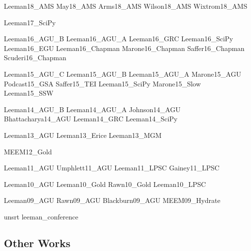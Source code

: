 \documentclass[letterpaper]{article}
\begin{document}
\begingroup
\renewcommand{\section}[2]{}

\nocite{conf}{Leeman18_AMS}
\nocite{conf}{May18_AMS}
\nocite{conf}{Arms18_AMS}
\nocite{conf}{Wilson18_AMS}
\nocite{conf}{Wixtrom18_AMS}

\nocite{conf}{Leeman17_SciPy}

\nocite{conf}{Leeman16_AGU_B}
\nocite{conf}{Leeman16_AGU_A}
\nocite{conf}{Leeman16_GRC}
\nocite{conf}{Leeman16_SciPy}
\nocite{conf}{Leeman16_EGU}
\nocite{conf}{Leeman16_Chapman}
\nocite{conf}{Marone16_Chapman}
\nocite{conf}{Saffer16_Chapman}
\nocite{conf}{Scuderi16_Chapman}

\nocite{conf}{Leeman15_AGU_C}
\nocite{conf}{Leeman15_AGU_B}
\nocite{conf}{Leeman15_AGU_A}
\nocite{conf}{Marone15_AGU}
\nocite{conf}{Podcast15_GSA}
\nocite{conf}{Saffer15_TEI}
\nocite{conf}{Leeman15_SciPy}
\nocite{conf}{Marone15_Slow}
\nocite{conf}{Leeman15_SSW}

\nocite{conf}{Leeman14_AGU_B}
\nocite{conf}{Leeman14_AGU_A}
\nocite{conf}{Johnson14_AGU}
\nocite{conf}{Bhattacharya14_AGU}
\nocite{conf}{Leeman14_GRC}
\nocite{conf}{Leeman14_SciPy}

\nocite{conf}{Leeman13_AGU}
\nocite{conf}{Leeman13_Erice}
\nocite{conf}{Leeman13_MGM}

\nocite{conf}{MEEM12_Gold}

\nocite{conf}{Leeman11_AGU}
\nocite{conf}{Umphlett11_AGU}
\nocite{conf}{Leeman11_LPSC}
\nocite{conf}{Gainey11_LPSC}

\nocite{conf}{Leeman10_AGU}
\nocite{conf}{Leeman10_Gold}
\nocite{conf}{Rawn10_Gold}
\nocite{conf}{Leeman10_LPSC}

\nocite{conf}{Leeman09_AGU}
\nocite{conf}{Rawn09_AGU}
\nocite{conf}{Blackburn09_AGU}
\nocite{conf}{MEEM09_Hydrate}


{unsrt}
{leeman_conference}{}
\endgroup

\subsection*{Other Works}
\end{document}
